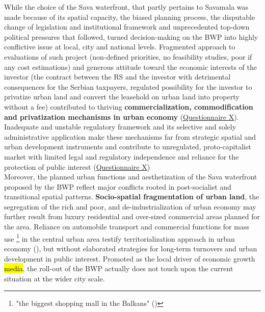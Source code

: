 \documentclass[11pt]{report}
\begin{document}
While the choice of the Sava waterfront, that partly pertains to Savamala was made because of its spatial capacity, the biased planning process, the disputable change of legislation and institutional framework and unprecedented top-down political pressures that followed, turned decision-making on the BWP into highly conflictive issue at local, city and national levels.
Fragmented approach to evaluations of such project (non-defined priorities, no feasibility studies, poor if any cost estimations) and generous attitude toward the economic interests of the investor (the contract between the RS and the investor with detrimental consequences for the Serbian taxpayers, regulated possibility for the investor to privatize urban land and convert the leasehold on urban land into property without a fee) contributed to thriving \textbf{commercialization, commodification and privatization mechanisms in urban economy}
(\href{Questionnaire Experts Savamala}{Questionnaire X}).
Inadequate and unstable regulatory framework and its selective and solely administrative application make these mechanisms far from strategic spatial and urban development instruments and contribute to unregulated, proto-capitalist market with limited legal and regulatory independence and reliance for the protection of public interest
(\href{Questionnaire Experts Savamala}{Questionnaire X})
\\

Moreover, the planned urban functions and aesthetization of the Sava waterfront proposed by the BWP reflect major conflicts rooted in post-socialist and transitional spatial patterns.
\textbf{Socio-spatial fragmentation of urban land}, the segregation of the rich and poor, and de-industrialization of urban economy may further result from luxury residential and over-sized commercial areas planned for the area.
Reliance on automobile transport and commercial functions for mass use
\footnote{"the biggest shopping mall in the Balkans" (\cite{media})}
in the central urban area testify territorialization approach in urban economy (\href{Hirt}{\cite{hirt_belgrade_2009}}), but without elaborated strategies for long-term turnovers and urban development in public interest.
Promoted as the local driver of economic growth \hl{media}, the roll-out of the BWP actually does not touch upon the current situation at the wider city scale.
\\
\end{document}
